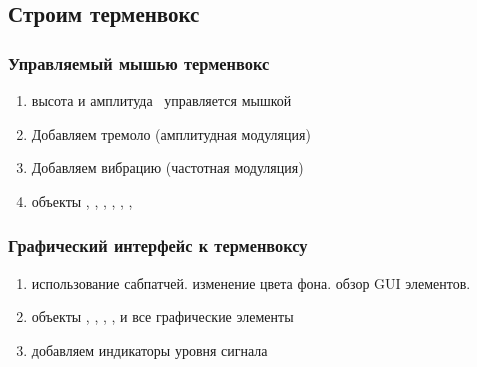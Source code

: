 \subsection{Строим терменвокс}

\subsubsection{Управляемый мышью терменвокс}

\begin{enumerate}
	\item высота и амплитуда \synth \ управляется мышкой 
	\item Добавляем тремоло (амплитудная модуляция)
	\item Добавляем вибрацию (частотная модуляция)
	\item объекты , , , \pdobj{+\~}, \pdobj{+}, , 
\end{enumerate}




\subsubsection{Графический интерфейс к терменвоксу}
\begin{enumerate}
	\item использование сабпатчей. изменение цвета фона. обзор GUI элементов.
	\item объекты  , , , ,  и все графические элементы
	\item добавляем индикаторы уровня сигнала
\end{enumerate}

